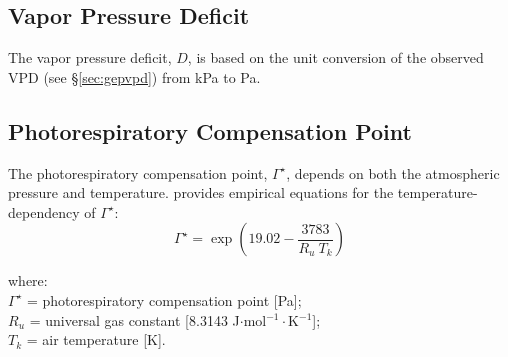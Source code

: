 \subsection{Vapor Pressure Deficit}
\label{sec:d}
The vapor pressure deficit, $D$, is based on the unit conversion of the observed VPD (see \S \ref{sec:gepvpd}) from kPa to Pa.

\subsection{Photorespiratory Compensation Point}
\label{sec:gs}
The photorespiratory compensation point, $\Gamma^\star$, depends on both the atmospheric pressure and temperature.
\cite{bernacchi01} provides empirical equations for the temperature-dependency of $\Gamma^\star$:
\begin{equation}
\label{eq:gst}
    \Gamma^\star = \exp \left(19.02 - \frac{3783}{R_u\: T_k}\right)
\end{equation}

\noindent where:\\
\indent $\Gamma^\star$ = photorespiratory compensation point [Pa];\\
\indent $R_u$ = universal gas constant [8.3143 J$\cdot$mol$^{-1}\cdot$K$^{-1}$];\\
\indent $T_k$ = air temperature [K].\\
